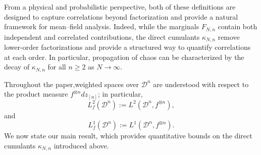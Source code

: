 \documentclass[pdflatex,sn-mathphys-num]{sn-jnl}
\theoremstyle{thmstyleone}%
\theoremstyle{thmstyletwo}%
\theoremstyle{thmstylethree}%
\begin{document}
From a physical and probabilistic perspective, both of these definitions are designed to capture correlations beyond factorization and provide a natural framework for mean--field analysis. Indeed, while the marginals $F_{N,n}$ contain both independent and correlated contributions, the direct cumulants $\kappa_{N,n}$ remove lower-order factorizations and provide a structured way to quantify correlations at each order. In particular, propagation of chaos can be characterized by the decay of $\kappa_{N,n}$ for all $n \geq 2$ as $N \to \infty$.

Throughout the paper,weighted spaces over \(\mathcal{D}^n\) are understood with respect to the product measure \(f^{\otimes n}dz_{[n]}\); in particular,
\[
L_f^2(\mathcal{D}^n):=L^2\!\left(\mathcal{D}^n,f^{\otimes n}\right),
\]
and
\[
L_f^1(\mathcal{D}^n):=L^1\!\left(\mathcal{D}^n,f^{\otimes n}\right).
\]
We now state our main result, which provides quantitative bounds on the direct cumulants $\kappa_{N,n}$ introduced above.
%
\end{document}
